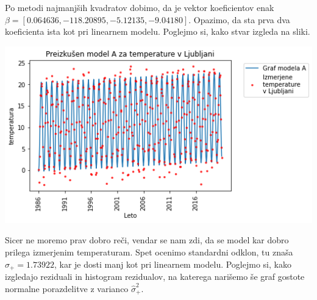 \documentclass[12pt, a4paper]{article}
\begin{document}
Po metodi najmanjših kvadratov dobimo, da je vektor koeficientov enak 
$\beta = [0.064636, -118.20895, -5.12135, -9.04180]$. Opazimo, da sta prva 
dva koeficienta ista kot pri linearnem modelu. Poglejmo si, kako stvar izgleda 
na sliki.

\begin{center}
    \includegraphics[scale=0.7]{Naloga_3_05}
\end{center}

Sicer ne moremo prav dobro reči, vendar se nam zdi, da se model kar dobro prilega 
izmerjenim temperaturam. Spet ocenimo standardni odklon, tu znaša $\hat{\sigma}_+ 
= 1.73922$, kar je dosti manj kot pri linearnem modelu. Poglejmo si, kako izgledajo 
reziduali in histogram rezidualov, na katerega narišemo še graf gostote normalne 
porazdelitve z varianco $\hat{\sigma}_+^2$.

\begin{figure}[h]
\end{figure}
\end{document}
